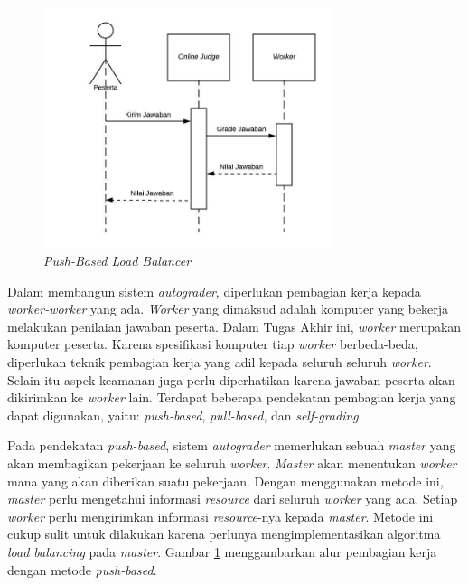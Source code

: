 \begin{figure}[ht!]
    \centering
    \includegraphics[width=0.75\textwidth]{images/load-balancing-push}
    \caption{\textit{Push-Based Load Balancer}}
    \label{fig:load-balancing-push}
\end{figure}

\par Dalam membangun sistem \textit{autograder}, diperlukan pembagian kerja kepada \textit{worker-worker} yang ada. \textit{Worker} yang dimaksud adalah komputer yang bekerja melakukan penilaian jawaban peserta. Dalam Tugas Akhir ini, \textit{worker} merupakan komputer peserta. Karena spesifikasi komputer tiap \textit{worker} berbeda-beda, diperlukan teknik pembagian kerja yang adil kepada seluruh seluruh \textit{worker}. Selain itu aspek keamanan juga perlu diperhatikan karena jawaban peserta akan dikirimkan ke \textit{worker} lain. Terdapat beberapa pendekatan pembagian kerja yang dapat digunakan, yaitu: \textit{push-based}, \textit{pull-based}, dan \textit{self-grading}.

\par Pada pendekatan \textit{push-based}, sistem \textit{autograder} memerlukan sebuah \textit{master} yang akan membagikan pekerjaan ke seluruh \textit{worker}. \textit{Master} akan menentukan \textit{worker} mana yang akan diberikan suatu pekerjaan. Dengan menggunakan metode ini, \textit{master} perlu mengetahui informasi \textit{resource} dari seluruh \textit{worker} yang ada. Setiap \textit{worker} perlu mengirimkan informasi \textit{resource}-nya kepada \textit{master}. Metode ini cukup sulit untuk dilakukan karena perlunya mengimplementasikan algoritma \textit{load balancing} pada \textit{master}. Gambar \ref{fig:load-balancing-push} menggambarkan alur pembagian kerja dengan metode \textit{push-based}.

